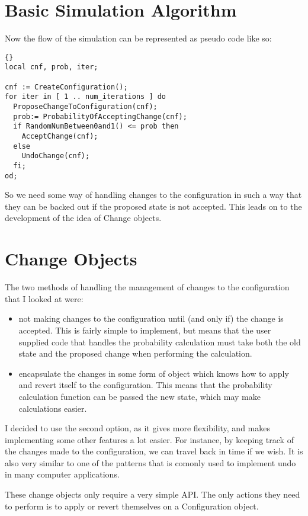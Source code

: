 \documentclass[12pt,a4paper]{book}  %
\begin{document}
\section{Basic Simulation Algorithm}

Now the flow of the simulation can be represented as pseudo code like
so:

\begin{lstlisting}{}
local cnf, prob, iter;

cnf := CreateConfiguration();
for iter in [ 1 .. num_iterations ] do
  ProposeChangeToConfiguration(cnf);
  prob:= ProbabilityOfAcceptingChange(cnf);
  if RandomNumBetween0and1() <= prob then
    AcceptChange(cnf);
  else
    UndoChange(cnf);
  fi;
od;
\end{lstlisting}

So we need some way of handling changes to the configuration in such a
way that they can be backed out if the proposed state is not accepted.
This leads on to the development of the idea of Change objects.

\section{Change Objects}

The two methods of handling the management of changes to the
configuration that I looked at were:

\begin{itemize}
\item not making changes to the configuration until (and only if) the
change is accepted.  This is fairly simple to implement, but means
that the user supplied code that handles the probability calculation
must take both the old state and the proposed change when performing
the calculation.
\item encapsulate the changes in some form of object which knows how
to apply and revert itself to the configuration.  This means that the
probability calculation function can be passed the new state, which
may make calculations easier.
\end{itemize}

I decided to use the second option, as it gives more flexibility, and
makes implementing some other features a lot easier.  For instance, by
keeping track of the changes made to the configuration, we can travel
back in time if we wish.  It is also very similar to one of the
patterns that is comonly used to implement undo in many computer
applications.

These change objects only require a very simple API.  The only actions
they need to perform is to apply or revert themselves on a
Configuration object.
\end{document}
